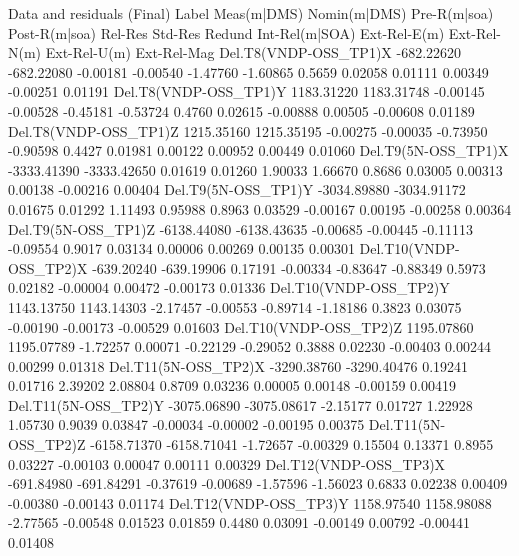 \newpage
\begin{landscape}
\fontsize{7.2}{7.2}
\begin{Snippet}
 Data and residuals (Final)
 Label                    Meas(m|DMS) Nomin(m|DMS) Pre-R(m|soa) Post-R(m|soa)   Rel-Res   Std-Res  Redund Int-Rel(m|SOA) Ext-Rel-E(m) Ext-Rel-N(m) Ext-Rel-U(m) Ext-Rel-Mag
 Del.T8(VNDP-OSS_TP1)X     -682.22620   -682.22080     -0.00181      -0.00540  -1.47760  -1.60865  0.5659        0.02058      0.01111      0.00349     -0.00251     0.01191
 Del.T8(VNDP-OSS_TP1)Y     1183.31220   1183.31748     -0.00145      -0.00528  -0.45181  -0.53724  0.4760        0.02615     -0.00888      0.00505     -0.00608     0.01189
 Del.T8(VNDP-OSS_TP1)Z     1215.35160   1215.35195     -0.00275      -0.00035  -0.73950  -0.90598  0.4427        0.01981      0.00122      0.00952      0.00449     0.01060
 Del.T9(5N-OSS_TP1)X      -3333.41390  -3333.42650      0.01619       0.01260   1.90033   1.66670  0.8686        0.03005      0.00313      0.00138     -0.00216     0.00404
 Del.T9(5N-OSS_TP1)Y      -3034.89880  -3034.91172      0.01675       0.01292   1.11493   0.95988  0.8963        0.03529     -0.00167      0.00195     -0.00258     0.00364
 Del.T9(5N-OSS_TP1)Z      -6138.44080  -6138.43635     -0.00685      -0.00445  -0.11113  -0.09554  0.9017        0.03134      0.00006      0.00269      0.00135     0.00301
 Del.T10(VNDP-OSS_TP2)X    -639.20240   -639.19906      0.17191      -0.00334  -0.83647  -0.88349  0.5973        0.02182     -0.00004      0.00472     -0.00173     0.01336
 Del.T10(VNDP-OSS_TP2)Y    1143.13750   1143.14303     -2.17457      -0.00553  -0.89714  -1.18186  0.3823        0.03075     -0.00190     -0.00173     -0.00529     0.01603
 Del.T10(VNDP-OSS_TP2)Z    1195.07860   1195.07789     -1.72257       0.00071  -0.22129  -0.29052  0.3888        0.02230     -0.00403      0.00244      0.00299     0.01318
 Del.T11(5N-OSS_TP2)X     -3290.38760  -3290.40476      0.19241       0.01716   2.39202   2.08804  0.8709        0.03236      0.00005      0.00148     -0.00159     0.00419
 Del.T11(5N-OSS_TP2)Y     -3075.06890  -3075.08617     -2.15177       0.01727   1.22928   1.05730  0.9039        0.03847     -0.00034     -0.00002     -0.00195     0.00375
 Del.T11(5N-OSS_TP2)Z     -6158.71370  -6158.71041     -1.72657      -0.00329   0.15504   0.13371  0.8955        0.03227     -0.00103      0.00047      0.00111     0.00329
 Del.T12(VNDP-OSS_TP3)X    -691.84980   -691.84291     -0.37619      -0.00689  -1.57596  -1.56023  0.6833        0.02238      0.00409     -0.00380     -0.00143     0.01174
 Del.T12(VNDP-OSS_TP3)Y    1158.97540   1158.98088     -2.77565      -0.00548   0.01523   0.01859  0.4480        0.03091     -0.00149      0.00792     -0.00441     0.01408

\end{Snippet}
\end{landscape}
